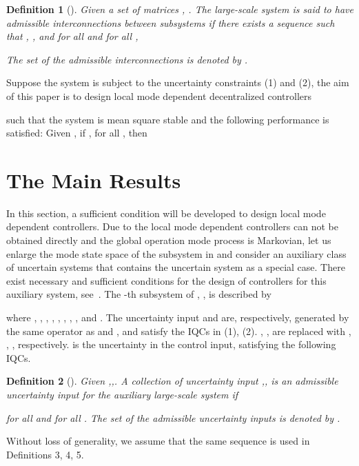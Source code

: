 \documentclass[11pt,draftcls,onecolumn]{IEEEtran}
\newtheorem{definition}{Definition}
\begin{document}
\begin{definition}
[\cite{Xiong2009}] Given a set of matrices , .
  The large-scale system is said to have admissible
  interconnections between subsystems if there exists a sequence
   such that , , and
  for all  and for all ,
\label{definition for interconnections}

The set of the admissible interconnections is denoted by .
\end{definition}



Suppose the system  is subject to the uncertainty constraints (1) and (2), the aim of this paper is to design local mode dependent decentralized controllers

such that the system  is mean square stable and  the
following  performance is satisfied: Given , if ,   for all
,  then


\section{The Main Results}
In this section,  a sufficient condition will be developed to design  local mode dependent controllers. Due to the local mode dependent controllers can not be obtained directly and the global operation mode process  is Markovian, let us enlarge the mode state space of the subsystem in  and   consider an auxiliary class of uncertain systems   that contains the uncertain system  as a special case. There exist  necessary and sufficient conditions for the design of  controllers for this auxiliary  system, see~\cite{Zhang2008,Marcos2008}.
The -th subsystem of , , is described by

where ,  , , , , , , ,  and . The uncertainty input  and  are, respectively, generated by the same operator as  and , and satisfy the IQCs in (1), (2). , ,  are replaced with , , , respectively.   is the uncertainty in the control input, satisfying the following IQCs.
\begin{definition} [\cite{Xiong2009}]
Given ,,. A collection of uncertainty input  ,, is an admissible uncertainty input for the auxiliary large-scale system   if
\label{definition for uncertainty in global system}

for all  and for all . The set of the admissible uncertainty inputs is denoted by .
\end{definition}

Without loss of generality, we assume that the same sequence
 is used in Definitions 3, 4, 5.
\end{document}
